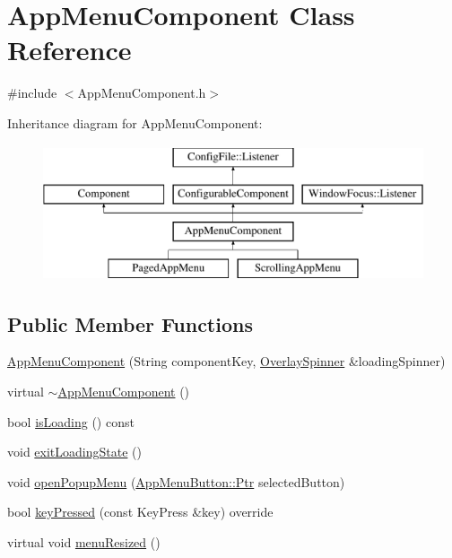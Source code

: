 \hypertarget{classAppMenuComponent}{}\section{App\+Menu\+Component Class Reference}
\label{classAppMenuComponent}


{\ttfamily \#include $<$App\+Menu\+Component.\+h$>$}

Inheritance diagram for App\+Menu\+Component\+:\begin{figure}[H]
\begin{center}
\leavevmode
\includegraphics[height=4.000000cm]{classAppMenuComponent}
\end{center}
\end{figure}
\subsection*{Public Member Functions}
\begin{DoxyCompactItemize}
\item 
\mbox{\hyperlink{classAppMenuComponent_a8f45bc3e1129b74539842cc80347deee}{App\+Menu\+Component}} (String component\+Key, \mbox{\hyperlink{classOverlaySpinner}{Overlay\+Spinner}} \&loading\+Spinner)
\item 
virtual \mbox{\hyperlink{classAppMenuComponent_a60eac163da7fb829ff5fe09f23df295f}{$\sim$\+App\+Menu\+Component}} ()
\item 
bool \mbox{\hyperlink{classAppMenuComponent_a34b9d65125be02234eadd43498ae0adc}{is\+Loading}} () const
\item 
void \mbox{\hyperlink{classAppMenuComponent_a6dec3cfe6fd266e720cc66ab3d0191b7}{exit\+Loading\+State}} ()
\item 
void \mbox{\hyperlink{classAppMenuComponent_a1e2dcc587da7b7ffacdff89e0cbb310c}{open\+Popup\+Menu}} (\mbox{\hyperlink{classAppMenuButton_aeb692efb6a933970de8eac14e5e71544}{App\+Menu\+Button\+::\+Ptr}} selected\+Button)
\item 
bool \mbox{\hyperlink{classAppMenuComponent_a510bdd8204a9c1164c482923f69e5819}{key\+Pressed}} (const Key\+Press \&key) override
\item 
virtual void \mbox{\hyperlink{classAppMenuComponent_a722d34923b746830bad57e960c4076a2}{menu\+Resized}} ()
\end{DoxyCompactItemize}
